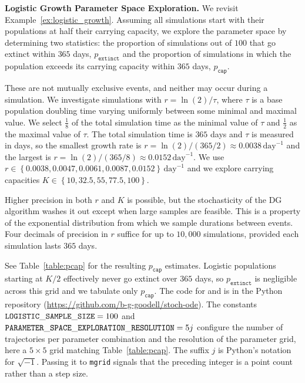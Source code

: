 \begin{example}\label{ex:exploration}
\textbf{Logistic Growth Parameter Space Exploration.}
We revisit Example~\ref{ex:logistic_growth}. Assuming all simulations start with their populations at half their carrying capacity, we explore the parameter space by determining two statistics: the proportion of simulations out of $100$ that go extinct within $365$ days, $p_{\texttt{extinct}}$ and the proportion of simulations in which the population exceeds its carrying capacity within $365$ days, $p_{\texttt{cap}}$.

These are not mutually exclusive events, and neither may occur during a simulation. We investigate simulations with $r = \ln(2)/\tau$, where $\tau$ is a base population doubling time varying uniformly between some minimal and maximal value. We select $\frac{1}{8}$ of the total simulation time as the minimal value of $\tau$ and $\frac{1}{2}$ as the maximal value of $\tau$. The total simulation time is $365$ days and $\tau$ is measured in days, so the smallest growth rate is $r = \ln(2)/(365/2) \approx 0.0038\,\text{day}^{-1}$ and the largest is $r = \ln(2)/(365/8) \approx 0.0152\,\text{day}^{-1}$. We use $r \in \left\{0.0038, 0.0047, 0.0061, 0.0087, 0.0152\right\}\,\text{day}^{-1}$ and we explore carrying capacities $K \in \left\{10, 32.5, 55, 77.5, 100\right\}$.

Higher precision in both $r$ and $K$ is possible, but the stochasticity of the DG algorithm washes it out except when large samples are feasible. This is a property of the exponential distribution from which we sample durations between events. Four decimals of precision in $r$ suffice for up to $10,000$ simulations, provided each simulation lasts $365$ days.

See Table~\ref{table:pcap} for the resulting $p_{\texttt{cap}}$ estimates. Logistic populations starting at $K/2$ effectively never go extinct over $365$ days, so $p_{\texttt{extinct}}$ is negligible across this grid and we tabulate only $p_{\texttt{cap}}$. The code for \MakeLogisticRates{} and \DgSimulateLogisticOde{} is in the Python repository (\url{https://github.com/b-g-goodell/stoch-ode}). The constants ${\tt LOGISTIC\_SAMPLE\_SIZE} = 100$ and ${\tt PARAMETER\_SPACE\_EXPLORATION\_RESOLUTION} = 5j$ configure the number of trajectories per parameter combination and the resolution of the parameter grid, here a $5 \times 5$ grid matching Table~\ref{table:pcap}. The suffix $j$ is Python's notation for $\sqrt{-1}$. Passing it to \texttt{mgrid} signals that the preceding integer is a point count rather than a step size.


\end{example}

